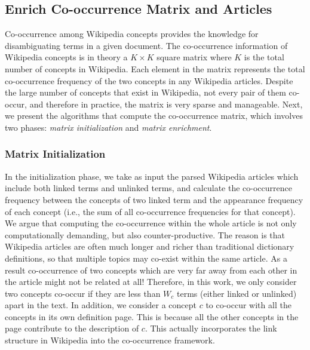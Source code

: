 \subsection{Enrich Co-occurrence Matrix and Articles}
\label{sec:enrich}


Co-occurrence among Wikipedia concepts provides
the knowledge for disambiguating terms in a given document.
The co-occurrence information of Wikipedia concepts is in theory
a $K \times K$ square matrix where $K$ is the total number of concepts in
Wikipedia. Each element in the matrix represents
the total co-occurrence frequency of the two concepts in
any Wikipedia articles.
Despite the large number of concepts that exist in Wikipedia, not every pair of
them co-occur, and therefore in practice, the matrix is very sparse and
manageable. Next, we present the algorithms that compute the co-occurrence
matrix, which involves two phases: {\em matrix initialization} and
{\em matrix enrichment}.

\subsubsection{Matrix Initialization}
In the initialization phase, we take as input the parsed Wikipedia articles
which include both linked terms and unlinked terms,
and calculate the co-occurrence frequency between the concepts of two linked
term and the appearance frequency of each concept
(i.e., the sum of all co-occurrence frequencies for that concept).
We argue that computing the co-occurrence within the whole article is not
only computationally demanding, but also counter-productive.
The reason is that Wikipedia articles are often much longer and richer than
traditional dictionary definitions, so that multiple topics may co-exist within
the same article. As a result co-occurrence of two concepts which are very far
away from each other in the article might not be related at all!
Therefore, in this work, we only consider two concepts co-occur if they are
less than $W_c$ terms (either linked or unlinked) apart in the text.
In addition, we consider a concept $c$ to co-occur with all the concepts
in its own definition page.
This is because all the other concepts in the page contribute
to the description of $c$. This actually incorporates the link structure
in Wikipedia into the co-occurrence framework.

